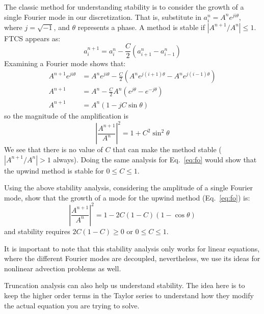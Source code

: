 The classic method for understanding stability is to consider the growth 
of a single Fourier mode in our discretization.  That is, substitute in
$a_i^n = A^n e^{ji\theta}$, where $j = \sqrt{-1}$, and $\theta$ represents a
phase.  A method is stable if $|A^{n+1}/A^n| \le 1$.  FTCS appears as:
\begin{equation}
  a_i^{n +1} = a_i^n - \frac{C}{2} (a_{i+1}^n - a_{i-1}^n)
\end{equation}
Examining a Fourier mode shows that:
\begin{align}
  A^{n+1}e^{ji\theta} &= A^n e^{ji\theta} - \frac{C}{2} \left (
      A^n e^{j(i+1)\theta} - A^n e^{j(i-1)\theta} \right ) \\
  A^{n+1} &= A^n  - \frac{C}{2} A^n \left ( e^{j\theta} - e^{-j\theta}\right ) \\
  A^{n+1} &= A^n \left ( 1 - j C \sin\theta \right )
\end{align}
so the magnitude of the amplification is
\begin{equation}
 \left | \frac{A^{n+1}}{A^n}\right |^2 = 1 + C^2\sin^2\theta
\end{equation}
We see that there is no value of $C$ that can make the method stable
($|A^{n+1}/A^n| > 1$ always).  Doing the same analysis for
Eq.~\ref{eq:fo} would show that the upwind method is stable for $0\le
C \le 1$. 

\begin{exercise}
{Using the above stability analysis, considering the amplitude of a
  single Fourier mode, show that the growth of a mode for the upwind
  method (Eq.~\ref{eq:fo}) is:
  \begin{equation}
    \left | \frac{A^{n+1}}{A^n} \right |^2 = 
           1 - 2C(1-C)(1-\cos\theta)
  \end{equation}
  and stability requires $2C(1-C) \ge 0$ or $0 \le C \le 1$.
}
\end{exercise}

It is important to note that this stability analysis only works for
linear equations, where the different Fourier modes are decoupled,
nevertheless, we use its ideas for nonlinear advection problems as
well.

Truncation analysis can also help us understand stability.  The idea
here is to keep the higher order terms in the Taylor series to understand
how they modify the actual equation you are trying to solve.

